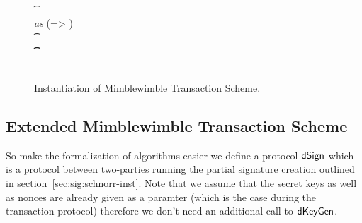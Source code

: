 \begin{figure}
\begin{center}
{\begin{varwidth}{\textwidth}
{            \t {} \\
            \pcforeach \varOutputs \textit{ as } (\varIterator => \varCoinOut) \\
            \t \pcif \procVerfProof{\varProofs[\varIterator]}{\varCoinOut[\varIterator]}  \\
            \t \t {} \\
            \varPubKey \opAssign \sum \varOutputs \opSub \sum \varInputs \\
            \pcreturn \procVerf{\varSignature}{\varMsg}{\varPubKey}
            }
        \end{varwidth}
        }
    \end{center}
    \caption{Instantiation of Mimblewimble Transaction Scheme. \label{fig:inst-mw-tx}}
\end{figure}

\subsection{Extended Mimblewimble Transaction Scheme}\label{subsec:atom:ext-tx-scheme}

So make the formalization of algorithms easier we define a protocol $\mathsf{dSign}$ which is a protocol between two-parties running the partial signature creation outlined in section~\ref{sec:sig:schnorr-inst}.
Note that we assume that the secret keys as well as nonces are already given as a paramter (which is the case during the transaction protocol) therefore we don't need an additional call to $\mathsf{dKeyGen}$.

